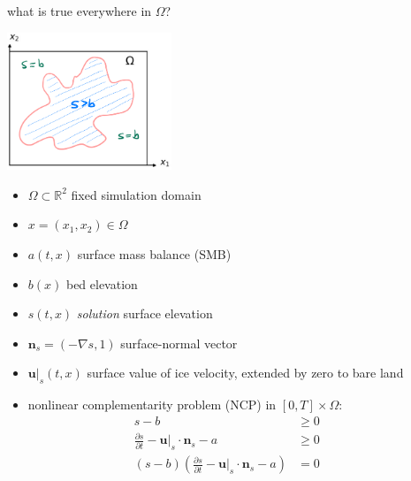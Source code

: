 \documentclass[10pt,dvipsnames]{beamer}
\theoremstyle{theorem}
\newcommand{\bn}{\mathbf{n}}
\newcommand{\bu}{\mathbf{u}}
\newcommand{\RR}{\mathbb{R}}
\newcommand{\grad}{\nabla}
\begin{document}
\begin{frame}{what is true everywhere in $\Omega$?}

\hfill \includegraphics[width=0.37\textwidth]{mapplane}

\vspace{-40mm}

\begin{minipage}[t]{60mm}
{\small
\begin{itemize}
\item $\Omega \subset \RR^2$ fixed simulation domain
\item $x = (x_1,x_2) \in \Omega$
\item $a(t,x)$ surface mass balance (SMB)
\item $b(x)$ bed elevation
\item $s(t,x)$ \emph{solution} surface elevation
\item $\bn_s = (- \grad s,1)$ surface-normal vector
\item $\bu|_s(t,x)$ surface value of ice velocity, extended by zero to bare land
\end{itemize}
}
\end{minipage}

\begin{itemize}
\item nonlinear complementarity problem (NCP) in $[0,T] \times \Omega$:
\begin{align*}
s - b &\ge 0 &&\phantom{x} \\
\frac{\partial s}{\partial t} - \bu|_s \cdot \bn_s - a &\ge 0 \\
(s - b) \left(\frac{\partial s}{\partial t} - \bu|_s \cdot \bn_s - a\right) &= 0
\end{align*}
\end{itemize}
\end{frame}
\end{document}
